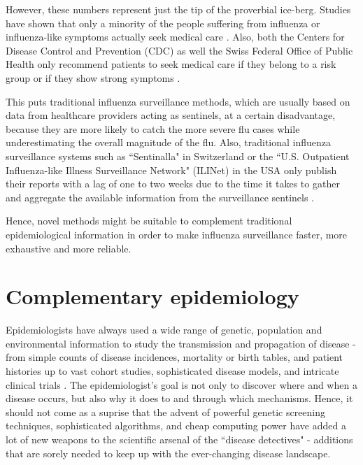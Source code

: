 \documentclass[11pt, a4paper]{report}\usepackage[]{graphicx}\usepackage[]{color}
\begin{document}
However, these numbers represent just the tip of the proverbial ice-berg. Studies have shown that only a minority of the people suffering from influenza or influenza-like symptoms actually seek medical care \citep{goff_surveillance_2015}. Also, both the Centers for Disease Control and Prevention (CDC) as well the Swiss Federal Office of Public Health only recommend patients to seek medical care if they belong to a risk group or if they show strong symptoms \citep{cdc_flu_2017,bag_grippe_2016}.

This puts traditional influenza surveillance methods, which are usually based on data from healthcare providers acting as sentinels, at a certain disadvantage, because they are more likely to catch the more severe flu cases while underestimating the overall magnitude of the flu. Also, traditional influenza surveillance systems such as ``Sentinalla" in Switzerland or the ``U.S. Outpatient Influenza-like Illness Surveillance Network" (ILINet) in the USA only publish their reports with a lag of one to two weeks due to the time it takes to gather and aggregate the available information from the surveillance sentinels \citep{bag_influenza_2017, sentinella_2017, cdc_surveillance_2016}.

Hence, novel methods might be suitable to complement traditional epidemiological information in order to make influenza surveillance faster, more exhaustive and more reliable. 

\section{Complementary epidemiology}
Epidemiologists have always used a wide range of genetic, population and environmental information to study the transmission and propagation of disease - from simple counts of disease incidences, mortality or birth tables, and patient histories up to vast cohort studies, sophisticated disease models, and intricate clinical trials \citep{rothman2012epidemiology,koepsell2014epidemiologic}. The epidemiologist's goal is not only to discover where and when a disease occurs, but also why it does to and through which mechanisms. Hence, it should not come as a suprise that the advent of powerful genetic screening techniques, sophisticated algorithms, and cheap computing power have added a lot of new weapons to the scientific arsenal of the ``disease detectives" \citep{bailey2005introduction, khoury_transforming_2013, gardy_real-time_2015} - additions that are sorely needed to keep up with the ever-changing disease landscape.\newline
\end{document}
